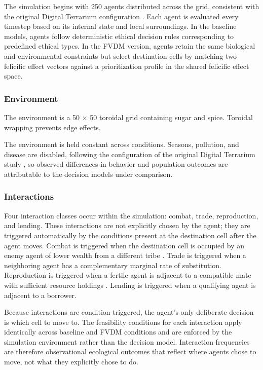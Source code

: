 \documentclass{icsthesis}
\begin{document}
\begin{mainmatter}
The simulation begins with 250 agents distributed across the grid, consistent with the original Digital Terrarium configuration \citep{KremerHerman2024b}. Each agent is evaluated every timestep based on its internal state and local surroundings. In the baseline models, agents follow deterministic ethical decision rules corresponding to predefined ethical types. In the FVDM version, agents retain the same biological and environmental constraints but select destination cells by matching two felicific effect vectors against a prioritization profile in the shared felicific effect space.

\subsubsection{Environment}
The environment is a 50 $\times$ 50 toroidal grid \citep{KremerHerman2024b} containing sugar and spice. Toroidal wrapping prevents edge effects.

The environment is held constant across conditions. Seasons, pollution, and disease are disabled, following the configuration of the original Digital Terrarium study \citep{KremerHerman2024b}, so observed differences in behavior and population outcomes are attributable to the decision models under comparison.

\subsubsection{Interactions}
Four interaction classes occur within the simulation: combat, trade, reproduction, and lending. These interactions are not explicitly chosen by the agent; they are triggered automatically by the conditions present at the destination cell after the agent moves. Combat is triggered when the destination cell is occupied by an enemy agent of lower wealth from a different tribe \citep{Kehoe2015}. Trade is triggered when a neighboring agent has a complementary marginal rate of substitution. Reproduction is triggered when a fertile agent is adjacent to a compatible mate with sufficient resource holdings \citep{Kehoe2015}. Lending is triggered when a qualifying agent is adjacent to a borrower.

Because interactions are condition-triggered, the agent’s only deliberate decision is which cell to move to. The feasibility conditions for each interaction apply identically across baseline and FVDM conditions and are enforced by the simulation environment rather than the decision model. Interaction frequencies are therefore observational ecological outcomes that reflect where agents chose to move, not what they explicitly chose to do.


\end{mainmatter}
\end{document}
